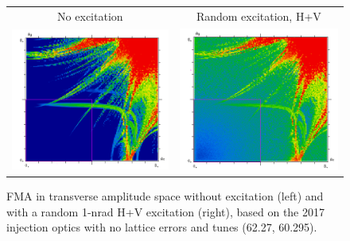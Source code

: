 \documentclass[
prstab
,reprint
,linenumbers
,longbibliography
,preprintnumbers
,showkeys
,amsfonts,amssymb,amsmath
,floatfix
]{revtex4-1}
\newlength{\fmawidth}
\begin{document}
\begin{figure}
  \begin{tabular}{cc}
    No excitation & Random excitation, H+V \\
    \includegraphics[width=\fmawidth]{2017injnocolc15o+19_6noerru_dp0_amp.png} &
    \includegraphics[width=\fmawidth]{2017injnocolc15o+19_6noerruranadthv_1nrad_dp0_amp.png} \\
  \end{tabular}
  \caption{FMA in transverse amplitude space without excitation (left)
    and with a random 1-nrad H+V excitation (right), based on the 2017
    injection optics with no lattice errors and tunes (62.27,
    60.295).}
  \label{fig:ran2017fmaamp}
\end{figure}
\end{document}
